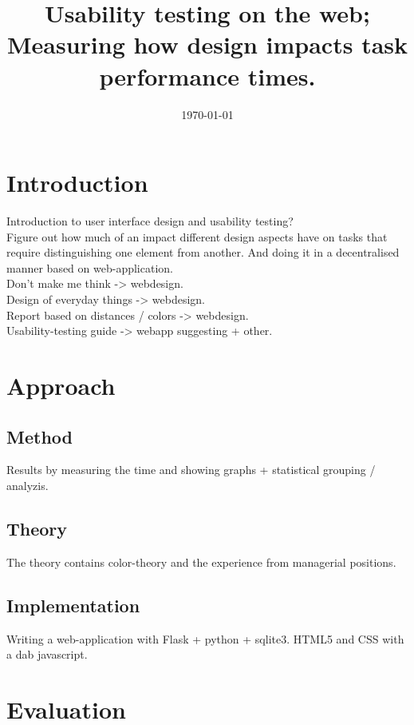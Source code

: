 \documentclass[nofilelist]{cslthse-msc}
\title{
  Usability testing on the web; Measuring how design impacts task performance
  times.
}
\date{\today}
\begin{document}
\renewcommand{\bibname}{References}

\makefrontmatter

\chapter{Introduction}
  Introduction to user interface design and usability testing? \\

  Figure out how much of an impact different design aspects have on tasks that
  require distinguishing one element from another. And doing it in a
  decentralised manner based on web-application. \\

  \noindent
  Don't make me think -> webdesign. \\
  Design of everyday things -> webdesign. \\
  Report based on distances / colors -> webdesign. \\
  Usability-testing guide -> webapp suggesting + other. \\


\chapter{Approach}
  \section{Method}

    Results by measuring the time and showing graphs + statistical grouping /
    analyzis. \\


  \section{Theory}

    The theory contains color-theory and the experience from managerial
    positions.

  \section{Implementation}

    Writing a web-application with Flask + python + sqlite3.
    HTML5 and CSS with a dab javascript.

\chapter{Evaluation}
\end{document}
